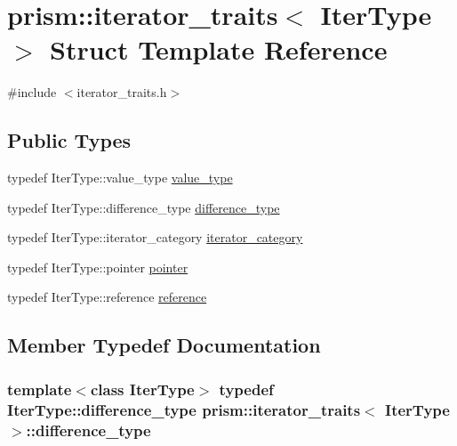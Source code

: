 \hypertarget{structprism_1_1iterator__traits}{}\section{prism\+:\+:iterator\+\_\+traits$<$ Iter\+Type $>$ Struct Template Reference}
\label{structprism_1_1iterator__traits}


{\ttfamily \#include $<$iterator\+\_\+traits.\+h$>$}

\subsection*{Public Types}
\begin{DoxyCompactItemize}
\item 
typedef Iter\+Type\+::value\+\_\+type \hyperlink{structprism_1_1iterator__traits_a764c6740051f048bb81ba63d993e96cd}{value\+\_\+type}
\item 
typedef Iter\+Type\+::difference\+\_\+type \hyperlink{structprism_1_1iterator__traits_a8b7341f458751d350b7c797f9326d578}{difference\+\_\+type}
\item 
typedef Iter\+Type\+::iterator\+\_\+category \hyperlink{structprism_1_1iterator__traits_a2e20906a677a5a465bf343ff4281a010}{iterator\+\_\+category}
\item 
typedef Iter\+Type\+::pointer \hyperlink{structprism_1_1iterator__traits_a5ec4c84886d15b5efa1bb3fd0984dd71}{pointer}
\item 
typedef Iter\+Type\+::reference \hyperlink{structprism_1_1iterator__traits_af4ddc7a938960bb8c558e6eae9ee1548}{reference}
\end{DoxyCompactItemize}


\subsection{Member Typedef Documentation}
\subsubsection[{\texorpdfstring{difference\+\_\+type}{difference_type}}]{\setlength{\rightskip}{0pt plus 5cm}template$<$class Iter\+Type$>$ typedef Iter\+Type\+::difference\+\_\+type {\bf prism\+::iterator\+\_\+traits}$<$ Iter\+Type $>$\+::{\bf difference\+\_\+type}}\hypertarget{structprism_1_1iterator__traits_a8b7341f458751d350b7c797f9326d578}{}\label{structprism_1_1iterator__traits_a8b7341f458751d350b7c797f9326d578}
